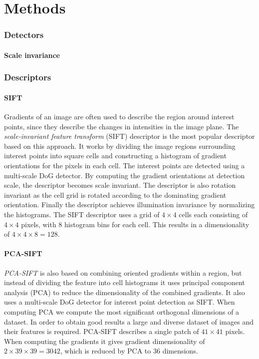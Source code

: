 \documentclass[thesis.tex]{subfiles}
\begin{document}
\chapter{Methods}

\subsection{Detectors}

\subsubsection{Scale invariance}

\subsection{Descriptors}

\subsubsection{SIFT}

Gradients of an image are often used to describe the region around interest points, since they describe the changes in intensities in the image plane.
The \emph{scale-invariant feature transform} (SIFT) descriptor
\cite{lowe2004distinctive} is the most popular descriptor based on this
approach. It works by dividing the image regions surrounding interest
points into square cells and constructing a histogram of gradient
orientations for the pixels in each cell. The interest points are detected
using a multi-scale DoG detector. By computing the gradient orientations
at detection scale, the descriptor becomes scale invariant. The descriptor
is also rotation invariant as the cell grid is rotated according to the
dominating gradient orientation. Finally the descriptor achieves illumination
invariance by normalizing the histograms. The SIFT descriptor uses a grid of
$4 \times 4$ cells each consisting of $4 \times 4$ pixels, with 8 histogram
bins for each cell. This results in a dimensionality of $4 \times 4 \times 8 =
128$.

\subsubsection{PCA-SIFT}

\emph{PCA-SIFT} \cite{ke2004pca} is also based on combining oriented gradients
within a region, but instead of dividing the feature into cell histograms
it uses principal component analysis (PCA) to reduce the dimensionality
of the combined gradients. It also uses a multi-scale DoG detector for
interest point detection as SIFT. When computing PCA we compute the most
significant orthogonal dimensions of a dataset. In order to obtain good
results a large and diverse dataset of images and their features is required.
PCA-SIFT describes a single patch of $41 \times 41$ pixels. When computing
the gradients it gives gradient dimensionality of $2\times39\times39 = 3042$,
which is reduced by PCA to 36 dimensions.
\end{document}
